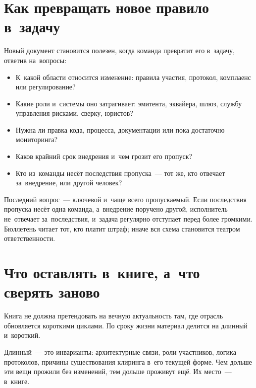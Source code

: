 \section*{Как превращать новое правило в~задачу}\label{sec:ps-tracking-triage}

Новый документ становится полезен, когда команда превратит его в~задачу,
ответив на~вопросы:

\begin{itemize}
  \item К~какой области относится изменение: правила участия, протокол,
    комплаенс или регулирование?
  \item Какие роли и~системы оно затрагивает: эмитента, эквайера, шлюз, службу
    управления рисками, сверку, юристов?
  \item Нужна ли правка кода, процесса, документации или пока достаточно
    мониторинга?
  \item Каков крайний срок внедрения и~чем грозит его пропуск?
  \item Кто из~команды несёт последствия пропуска~--- тот же, кто отвечает
    за~внедрение, или другой человек?
\end{itemize}

Последний вопрос~--- ключевой и~чаще всего пропускаемый. Если последствия
пропуска несёт одна команда, а~внедрение поручено другой, исполнитель
не~отвечает за~последствия, и~задача регулярно отступает перед более громкими. Бюллетень читает тот, кто платит штраф; иначе вся схема
становится театром ответственности.


\section*{Что оставлять в~книге, а~что сверять заново}\label{sec:ps-tracking-book-vs-reference}

Книга не должна претендовать на вечную актуальность там, где отрасль
обновляется короткими циклами. По сроку жизни материал делится на длинный и~короткий.

Длинный~--- это инварианты: архитектурные связи, роли участников, логика
протоколов, причины существования клиринга в~его текущей форме. Чем дольше эти
вещи прожили без изменений, тем дольше проживут ещё. Их место~--- в~книге.

